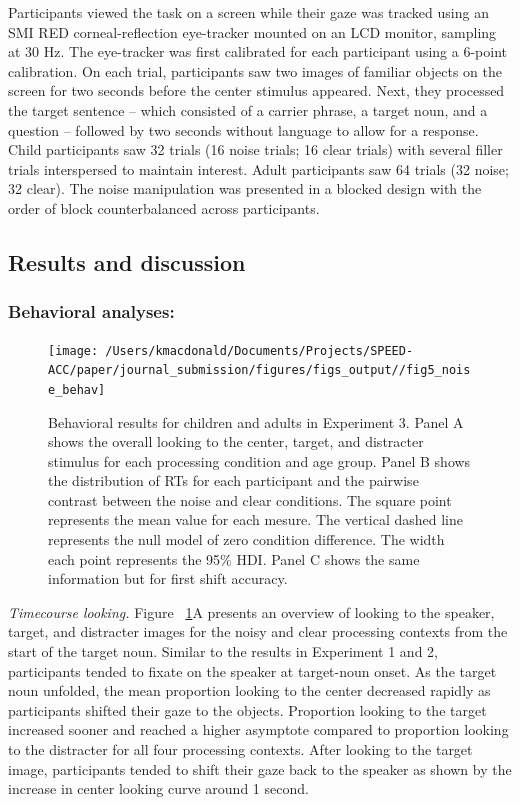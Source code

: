\documentclass[english,floatsintext,man]{apa6}
\begin{document}
Participants viewed the task on a screen while their gaze was tracked
using an SMI RED corneal-reflection eye-tracker mounted on an LCD
monitor, sampling at 30 Hz. The eye-tracker was first calibrated for
each participant using a 6-point calibration. On each trial,
participants saw two images of familiar objects on the screen for two
seconds before the center stimulus appeared. Next, they processed the
target sentence -- which consisted of a carrier phrase, a target noun,
and a question -- followed by two seconds without language to allow for
a response. Child participants saw 32 trials (16 noise trials; 16 clear
trials) with several filler trials interspersed to maintain interest.
Adult participants saw 64 trials (32 noise; 32 clear). The noise
manipulation was presented in a blocked design with the order of block
counterbalanced across participants.

\hypertarget{results-and-discussion-2}{%
\subsection{Results and discussion}\label{results-and-discussion-2}}

\hypertarget{behavioral-analyses-2}{%
\subsubsection{Behavioral analyses:}\label{behavioral-analyses-2}}

\begin{figure}[!t]

{\centering \texttt{[image: /Users/kmacdonald/Documents/Projects/SPEED-ACC/paper/journal\_submission/figures/figs\_output//fig5\_noise\_behav]} 

}

\caption{Behavioral results for children and adults in Experiment 3. Panel A shows the overall looking to the center, target, and distracter stimulus for each processing condition and age group. Panel B shows the distribution of RTs for each participant and the pairwise contrast between the noise and clear conditions. The square point represents the mean value for each mesure. The vertical dashed line represents the null model of zero condition difference. The width each point represents the 95\% HDI. Panel C shows the same information but for first shift accuracy.}\label{fig:noise-acc-rt-plot}
\end{figure}

\emph{Timecourse looking.} Figure ~\ref{fig:noise-acc-rt-plot}A presents
an overview of looking to the speaker, target, and distracter images for
the noisy and clear processing contexts from the start of the target
noun. Similar to the results in Experiment 1 and 2, participants tended
to fixate on the speaker at target-noun onset. As the target noun
unfolded, the mean proportion looking to the center decreased rapidly as
participants shifted their gaze to the objects. Proportion looking to
the target increased sooner and reached a higher asymptote compared to
proportion looking to the distracter for all four processing contexts.
After looking to the target image, participants tended to shift their
gaze back to the speaker as shown by the increase in center looking
curve around 1 second.
\end{document}

